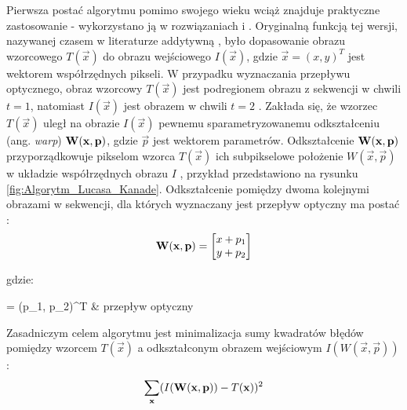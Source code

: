 Pierwsza postać algorytmu pomimo swojego wieku wciąż znajduje praktyczne zastosowanie - wykorzystano ją w rozwiązaniach \cite{Fernandez-Caballero2010} i \cite{Olivares-Mendez2009}. Oryginalną funkcją tej wersji, nazywanej czasem w literaturze addytywną \cite{Baker2004}, było dopasowanie obrazu wzorcowego $T(\vec{x})$ do obrazu wejściowego $I(\vec{x})$, gdzie $\vec{x} = (x, y)^T$ jest wektorem współrzędnych pikseli. W przypadku wyznaczania przepływu optycznego, obraz wzorcowy $T(\vec{x})$ jest podregionem obrazu z sekwencji w chwili $t = 1$, natomiast $I(\vec{x})$ jest obrazem w chwili $t = 2$ \cite{Baker2004}. Zakłada się, że wzorzec $T(\vec{x})$ uległ na obrazie $I(\vec{x})$ pewnemu sparametryzowanemu odkształceniu (ang. \textit{warp}) $\mathbf{W}(\mathbf{x}, \mathbf{p})$, gdzie $\vec{p}$ jest wektorem parametrów. Odkształcenie $\mathbf{W}(\mathbf{x}, \mathbf{p})$ przyporządkowuje pikselom wzorca $T(\vec{x})$ ich subpikselowe położenie $W(\vec{x}, \vec{p})$ w układzie współrzędnych obrazu $I$  \cite{Baker2004}, przykład przedstawiono na rysunku \ref{fig:Algorytm_Lucasa_Kanade}. Odkształcenie pomiędzy dwoma kolejnymi obrazami w sekwencji, dla których wyznaczany jest przepływ optyczny ma postać \cite{Baker2004}:
\begin{equation}
\label{equ:Odksztalcenie_przeplyw_optyczny}
	\mathbf{W}(\mathbf{x}, \mathbf{p}) = \begin{bmatrix}
		x + p_1 \\
		y + p_2 \\
	\end{bmatrix}
\end{equation}

\noindent
gdzie:

\begin{conditions}
	 = (p_1, p_2)^T & przepływ optyczny \\
\end{conditions}

Zasadniczym celem algorytmu jest minimalizacja sumy kwadratów błędów pomiędzy  wzorcem $T(\vec{x})$ a odkształconym obrazem wejściowym $I(W(\vec{x}, \vec{p}))$ \cite{Baker2004}:
\begin{equation}
\label{equ:Algorytm_Lucasa_Kanade_cel}
	\sum\limits_{\mathbf{x}} (I(\mathbf{W}(\mathbf{x}, \mathbf{p})) - T(\mathbf{x}))^2
\end{equation}

